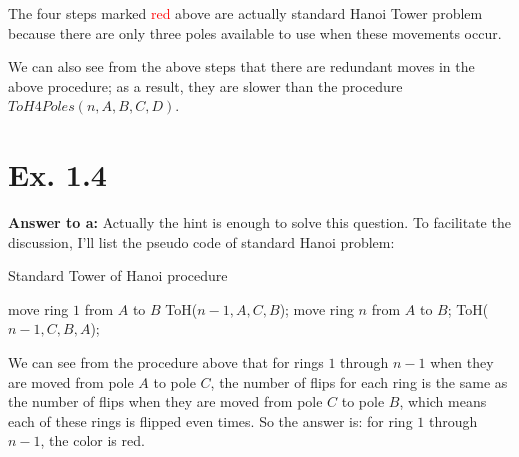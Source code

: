 \documentclass[a4paper,11pt]{article}
\theoremstyle{mytheor}
\begin{document}
The four steps marked \textcolor{red}{red} above are actually standard Hanoi Tower problem because there are only three poles available to use when these movements occur.
\iffalse
So we can write down the total steps of n rings as:
\begin{equation}
\begin{split}M(n) = &M(k-1) + 1 + 2^{n-k-2} - 1 + 1 + 2^{k-2} -1 + 1 + 2^{k-2}-1 + 2^{n-k-2} - 1 + 1 + M(k-1) \\
&=2M(k-1) + 2^{n-k-1} + 2^{k-1} -1
\end{split}
\end{equation}
\fi

We can also see from the above steps that there are redundant moves in the above procedure; as a result, they are slower than the procedure $ToH4Poles(n, A, B, C, D)$.

\vspace{1.2in}

\section*{Ex. 1.4}
\textbf{Answer to a:} Actually the hint is enough to solve this question. To facilitate the discussion, I'll list the pseudo code of standard Hanoi problem:

\iffalse
\begin{lstlisting}[label={list:seventh},caption=Standard Tower of Hanoi procedure.]
procedure ToH(n, A, B, C);
  if n == 1:
    move ring 1 from A to B;
  else:
    ToH(n-1, A, C, B);
    move ring n from A to B;
    ToH(n-1, C, B, A);
  end if
\end{lstlisting}
\fi

\begin{algorithm}[H]
\caption{Standard Tower of Hanoi procedure}\label{TOH1_4}
\begin{algorithmic}[1]
    \State move ring $1$ from $A$ to $B$
  \Else
    \State ToH($n-1, A, C, B$);
    \State move ring $n$ from $A$ to $B$;
    \State ToH($n-1, C, B, A$);
  \EndIf
\EndProcedure
\end{algorithmic}
\end{algorithm}

We can see from the procedure above that for rings $1$ through $n-1$ when they are moved from pole $A$ to pole $C$, the number of flips for each ring is the same as the number of flips when they are moved from pole $C$ to pole $B$, which means each of these rings is flipped even times. So the answer is: for ring $1$ through $n-1$, the color is red.
\end{document}
